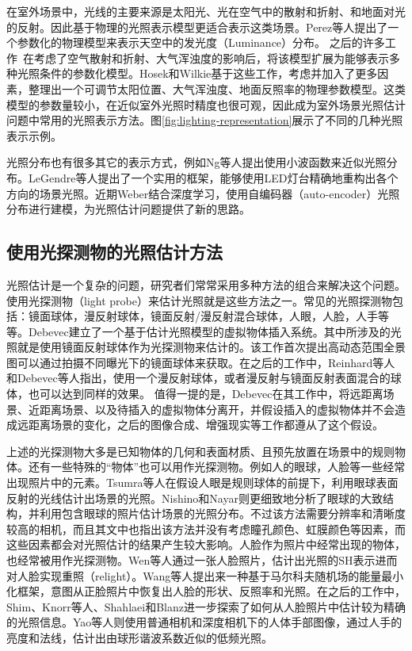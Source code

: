 在室外场景中，光线的主要来源是太阳光、光在空气中的散射和折射、和地面对光的反射。因此基于物理的光照表示模型更适合表示这类场景。Perez等人\cite{perez1993all}提出了一个参数化的物理模型来表示天空中的发光度（Luminance）分布。
之后的许多工作~\cite{nishita1996display, sirai1993display, preetham1999practical,raab2008unbiased}在考虑了空气散射和折射、大气浑浊度的影响后，将该模型扩展为能够表示多种光照条件的参数化模型。Hosek和Wilkie\cite{hosek2012analytic, hovsekhovsek2013adding}基于这些工作，考虑并加入了更多因素，整理出一个可调节太阳位置、大气浑浊度、地面反照率的物理参数模型。这类模型的参数量较小，在近似室外光照时精度也很可观，因此成为室外场景光照估计问题中常用的光照表示方法。图\ref{fig:lighting-representation}展示了不同的几种光照表示示例。

光照分布也有很多其它的表示方式，例如Ng等人\cite{ng2003all}提出使用小波函数来近似光照分布。LeGendre等人\cite{legendre2016practical}提出了一个实用的框架，能够使用LED灯台精确地重构出各个方向的场景光照。近期Weber\cite{weber2018learning}结合深度学习，使用自编码器（auto-encoder）光照分布进行建模，为光照估计问题提供了新的思路。

\subsection{使用光探测物的光照估计方法} 
光照估计是一个复杂的问题，研究者们常常采用多种方法的组合来解决这个问题。使用光探测物（light probe）来估计光照就是这些方法之一。常见的光照探测物包括：镜面球体，漫反射球体，镜面反射/漫反射混合球体，人眼，人脸，人手等等。Debevec\cite{debevec1998rendering}建立了一个基于估计光照模型的虚拟物体插入系统。其中所涉及的光照就是使用镜面反射球体作为光探测物来估计的。该工作首次提出高动态范围全景图可以通过拍摄不同曝光下的镜面球体来获取。在之后的工作中，Reinhard等人\cite{reinhard2005high}和Debevec等人\cite{debevec2012single}指出，使用一个漫反射球体，或者漫反射与镜面反射表面混合的球体，也可以达到同样的效果。 值得一提的是，Debevec在其工作\cite{debevec1998rendering}中，将远距离场景、近距离场景、以及待插入的虚拟物体分离开，并假设插入的虚拟物体并不会造成远距离场景的变化，之后的图像合成、增强现实等工作都遵从了这个假设。


上述的光探测物大多是已知物体的几何和表面材质、且预先放置在场景中的规则物体。还有一些特殊的“物体”也可以用作光探测物。例如人的眼球，人脸等一些经常出现照片中的元素。Tsumra等人\cite{tsumura2003estimating}在假设人眼是规则球体的前提下，利用眼球表面反射的光线估计出场景的光照。Nishino和Nayar\cite{nishino2004eyes}则更细致地分析了眼球的大致结构，并利用包含眼球的照片估计场景的光照分布。不过该方法需要分辨率和清晰度较高的相机，而且其文中也指出该方法并没有考虑瞳孔颜色、虹膜颜色等因素，而这些因素都会对光照估计的结果产生较大影响。人脸作为照片中经常出现的物体，也经常被用作光探测物。Wen等人\cite{wen2003face}通过一张人脸照片，估计出光照的SH表示进而对人脸实现重照（relight）。Wang等人\cite{wang2007face}提出来一种基于马尔科夫随机场的能量最小化框架，意图从正脸照片中恢复出人脸的形状、反照率和光照。在之后的工作中，Shim\cite{shim2012faces}、Knorr等人\cite{knorr2014real}、Shahlaei和Blanz\cite{shahlaei2015realistic}进一步探索了如何从人脸照片中估计较为精确的光照信息。Yao等人\cite{yao2013hand}则使用普通相机和深度相机下的人体手部图像，通过人手的亮度和法线，估计出由球形谐波系数近似的低频光照。

